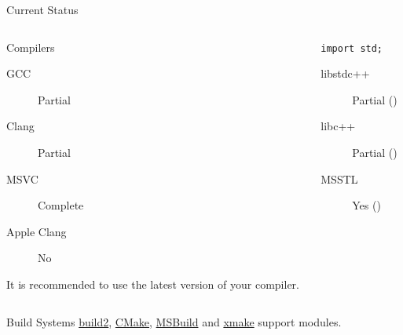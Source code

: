 \documentclass[aspectratio=169]{beamer}
\begin{document}
\begin{frame}{Current Status}
  \begin{columns}[t]
    \begin{column}{0.5\textwidth}
      \begin{block}{Compilers}
        \small
        \begin{description}
          \item[GCC] Partial 
          \item[Clang] Partial
          \item[MSVC] Complete
          \item[Apple Clang] No
        \end{description}
        It is recommended to use the latest version of your compiler.
      \end{block}
    \end{column}

    \begin{column}{0.5\textwidth}
      \begin{block}{\texttt{import std;}}
        \small
        \begin{description}
          \item[libstdc++] Partial ()
          \item[libc++] Partial ()
          \item[MSSTL] Yes ()
        \end{description}
      \end{block}
    \end{column}
  \end{columns}

  \vspace{1em}

  \begin{block}{Build Systems}
    \href{https://build2.org/}{build2}, \href{https://cmake.org/}{CMake},
    \href{https://learn.microsoft.com/en-us/visualstudio/msbuild/msbuild-command-line-reference?view=vs-2022}{MSBuild}
    and \href{https://xmake.io/}{xmake} support modules.
  \end{block}
\end{frame}
\end{document}
